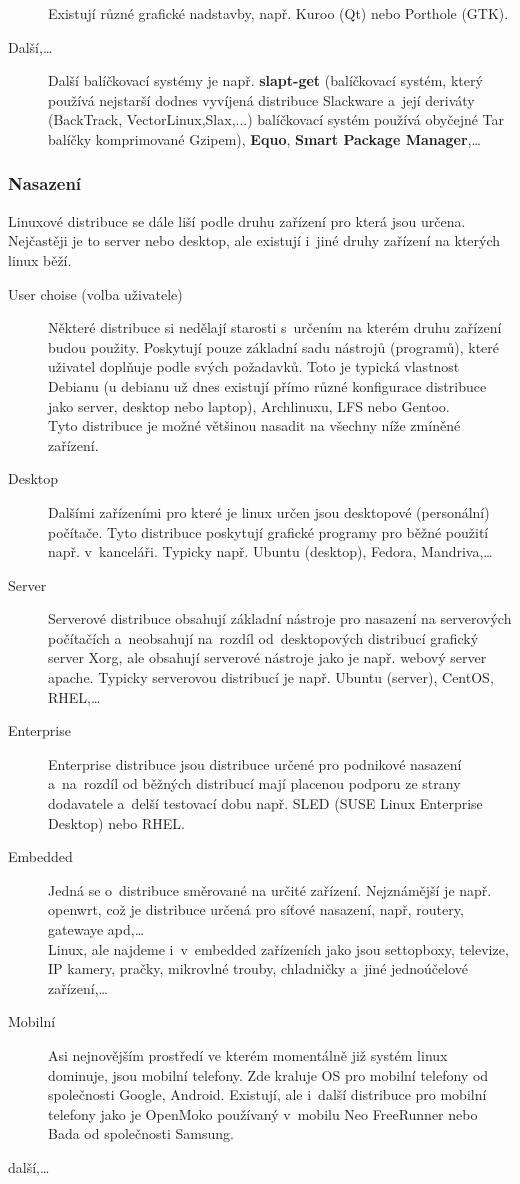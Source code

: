 \documentclass[a4paper,12pt]{article}
\renewcommand{\b}[1]{\textbf{#1}} %
\begin{document}
\begin{description}
Existují různé grafické nadstavby, např. Kuroo (Qt) nebo Porthole (GTK).
 \item[Další,…] Další balíčkovací systémy je např. \b{slapt-get} (balíčkovací systém, který používá nejstarší dodnes vyvíjená distribuce Slackware a~její deriváty (BackTrack, VectorLinux,Slax,...) balíčkovací systém používá obyčejné Tar balíčky komprimované Gzipem), \b{Equo}, \b{Smart Package Manager},…
 \end{description}

\subsubsection{Nasazení}
Linuxové distribuce se dále liší podle druhu zařízení pro která jsou určena. Nejčastěji je to server nebo desktop, ale existují i~jiné druhy zařízení na kterých linux běží.
\begin{description}
 \item[User choise (volba uživatele)] Některé distribuce si nedělají starosti s~určením na kterém druhu zařízení budou použity. Poskytují pouze základní sadu nástrojů (programů), které uživatel doplňuje podle svých požadavků. Toto je typická vlastnost Debianu (u debianu už dnes existují přímo různé konfigurace distribuce jako server, desktop nebo laptop), Archlinuxu, LFS nebo Gentoo.\\
Tyto distribuce je možné většinou nasadit na všechny níže zmíněné zařízení.
 \item[Desktop] Dalšími zařízeními pro které je linux určen jsou desktopové (personální) počítače. Tyto distribuce poskytují grafické programy pro běžné použití např. v~kanceláři. Typicky např. Ubuntu (desktop), Fedora, Mandriva,…
 \item[Server] Serverové distribuce obsahují základní nástroje pro nasazení na serverových počítačích a~neobsahují na~rozdíl od~desktopových distribucí grafický server Xorg, ale obsahují serverové nástroje jako je např. webový server apache. Typicky serverovou distribucí je např. Ubuntu (server), CentOS, RHEL,…
 \item[Enterprise] Enterprise distribuce jsou distribuce určené pro podnikové nasazení a~na~rozdíl od běžných distribucí mají placenou podporu ze strany dodavatele a~delší testovací dobu např. SLED (SUSE Linux Enterprise Desktop) nebo RHEL.
 \item[Embedded] Jedná se o~distribuce směrované na určité zařízení. Nejznámější je např. openwrt, což je distribuce určená pro síťové nasazení, např, routery, gatewaye apd,…\\
Linux, ale najdeme i~v~embedded zařízeních jako jsou settopboxy, televize, IP kamery, pračky, mikrovlné trouby, chladničky a~jiné jednoúčelové zařízení,…
 \item[Mobilní] Asi nejnovějším prostředí ve kterém momentálně již  systém linux dominuje, jsou mobilní telefony. Zde kraluje OS pro mobilní telefony od společnosti Google, Android. Existují, ale i~další distribuce pro mobilní telefony jako je OpenMoko používaný v~mobilu Neo FreeRunner nebo Bada od společnosti Samsung.
 \item[další,…] 
 \end{description}
\end{document}
